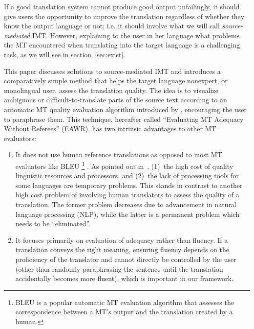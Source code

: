 \documentclass[hidelinks,10pt,letter]{article} %
\begin{document}
    If a good translation system cannot produce good output unfailingly, it should give users the
    opportunity to improve the translation regardless of whether they know the output language or 
    not; i.e. it should involve what we will call \textit{source-mediated} IMT. 
    However, explaining to the user in her language what problems the MT encountered
    when translating into the target language is a  challenging task, as we
    will see in section~\ref{sec:exist}. 
    
    This paper discusses solutions to source-mediated IMT and
    introduces a comparatively simple method that helps
    the target language nonexpert, or monolingual user, assess the translation quality. The idea is to
    visualize ambiguous or difficult-to-translate parts of the source text according to an automatic MT 
    quality evaluation algorithm introduced by \cite{mehdad2012match},
    encouraging the user to paraphrase them.
    This technique, hereafter called ``Evaluating MT Adequacy Without Referees'' (EAWR), has two intrinsic 
    advantages to other MT evaluators: %
    \begin{enumerate}
        \item It does not use human reference translations as opposed to most
            MT evaluators like BLEU%
            \footnote{BLEU \cite{papineni2002bleu} is a popular automatic MT evaluation algorithm that  
            assesses the correspondence between a MT's output and the translation created by a human.}%
            . As pointed out in~\cite{mehdad2012match}, (1)~the high cost of quality linguistic resources and processors,
            and (2)~the lack of processing tools for some languages are temporary problems. This stands in contrast to another high cost problem of 
            involving human translators to assess the quality of a translation. The former problem decreases due to 
            advancement in natural language processing (NLP),
            while the latter is a permanent problem which needs to be ``eliminated''.
        \item It focuses primarily on evaluation of adequacy rather than fluency. If a translation conveys the right meaning,
            ensuring fluency depends on the proficiency of the translator and cannot directly be controlled by the user (other
            than randomly paraphrasing the sentence until the translation accidentally becomes more fluent), which is important
            in our framework.
    \end{enumerate}
    
\end{document}
